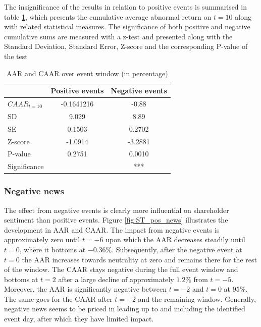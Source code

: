 The insignificance of the results in relation to positive events is summarised in table \ref{tab: ST_significace}, which presents the cumulative average abnormal return on $t=10$ along with related statistical measures. The significance of both positive and negative cumulative sums are measured with a z-test and presented along with the Standard Deviation, Standard Error, Z-score and the corresponding P-value of the test




\begin{table}[ht]
\centering
\begin{tabular}{lcc}
  \hline
  & Positive events & Negative events  \\
 \hline
$CAAR_{t=10}$ & -0.1641216   & -0.88  \\ 
SD & 9.029 & 8.89 \\ 
 SE & 0.1503 & 0.2702  \\ 
 Z-score  & -1.0914 & -3.2881 \\ 
 P-value  & 0.2751 & 0.0010  \\ 
 Significance &  & *** \\ 
 
   \hline
\end{tabular}
\caption{AAR and CAAR over event window (in percentage)} 
\label{tab: ST_significace}
\end{table}




 \label{ST_tab}

\subsubsection{Negative news}

The effect from negative events is clearly more influential on shareholder sentiment than positive events. Figure \ref{fig:ST_pos_news} illustrates the development in AAR and CAAR. The impact from negative events is approximately zero until $t = -6$ upon which the AAR decreases steadily until $t=0$, where it bottoms at $-0.36\%$. Subsequently, after the negative event at $t=0$ the AAR increases towards neutrality at zero and remains there for the rest of the window. The CAAR stays negative during the full event window and bottoms at $t=2$ after a large decline of approximately $1.2\%$ from  $t=-5$.
Moreover, the AAR is significantly negative between $t=-2$ and $t=0$ at $95\%$. The same goes for the CAAR after $t=-2$ and the remaining window. Generally, negative news seems to be priced in leading up to and including the identified event day, after which they have limited impact. 

